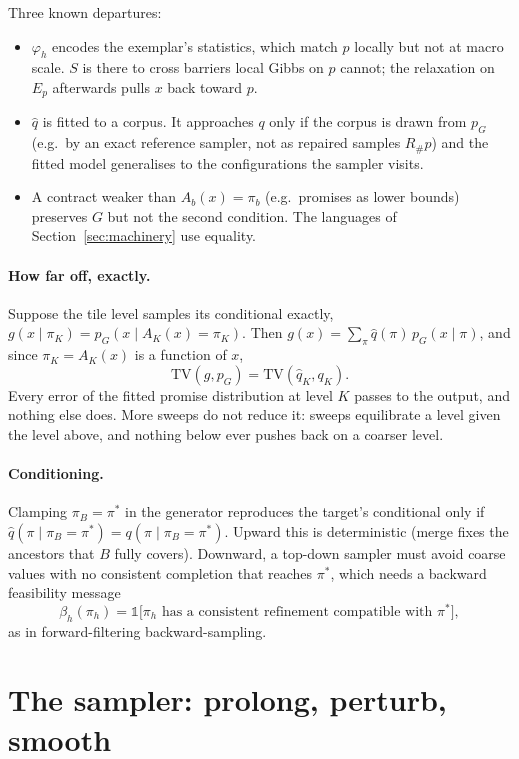 \documentclass[11pt]{article}
\newcommand{\1}{\mathds{1}}
\begin{document}
Three known departures:
\begin{itemize}
  \item $\varphi_h$ encodes the exemplar's statistics, which match $p$ locally but not at
        macro scale. $S$ is there to cross barriers local Gibbs on $p$ cannot; the
        relaxation on $E_p$ afterwards pulls $x$ back toward $p$.
  \item $\hat q$ is fitted to a corpus. It approaches $q$ only if the corpus is drawn from
        $p_G$ (e.g.\ by an exact reference sampler, not as repaired samples $R_\# p$) and the
        fitted model generalises to the configurations the sampler visits.
  \item A contract weaker than $A_b(x) = \pi_b$ (e.g.\ promises as lower bounds) preserves
        $G$ but not the second condition. The languages of Section~\ref{sec:machinery} use
        equality.
\end{itemize}

\paragraph{How far off, exactly.} Suppose the tile level samples its conditional exactly,
$g(x \mid \pi_K) = p_G(x \mid A_K(x) = \pi_K)$. Then $g(x) = \sum_\pi \hat q(\pi)\, p_G(x \mid
\pi)$, and since $\pi_K = A_K(x)$ is a function of $x$,
\[
  \mathrm{TV}(g, p_G) = \mathrm{TV}(\hat q_K, q_K).
\]
Every error of the fitted promise distribution at level $K$ passes to the output, and nothing
else does. More sweeps do not reduce it: sweeps equilibrate a level given the level above, and
nothing below ever pushes back on a coarser level.

\paragraph{Conditioning.} Clamping $\pi_B = \pi^*$ in the generator reproduces the target's
conditional only if $\hat q(\pi \mid \pi_B = \pi^*) = q(\pi \mid \pi_B = \pi^*)$. Upward
this is deterministic (merge fixes the ancestors that $B$ fully covers). Downward, a
top-down sampler must avoid coarse values with no consistent completion that reaches
$\pi^*$, which needs a backward feasibility message
\[
  \beta_h(\pi_h) = \1\big[\pi_h \text{ has a consistent refinement compatible with } \pi^*\big],
\]
as in forward-filtering backward-sampling.

\section{The sampler: prolong, perturb, smooth}
\label{sec:sampler}
\end{document}
